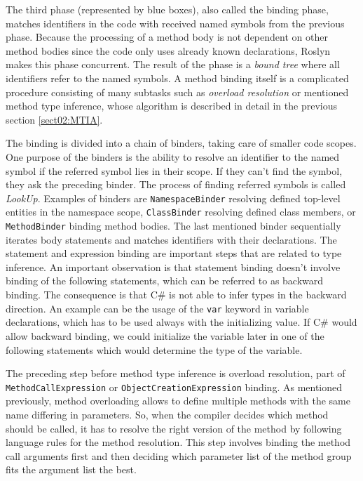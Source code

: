 The third phase (represented by blue boxes), also called the binding phase, matches identifiers in the code with received named symbols from the previous phase. 
Because the processing of a method body is not dependent on other method bodies since the code only uses already known declarations, Roslyn makes this phase concurrent. 
The result of the phase is a \emph{bound tree} where all identifiers refer to the named symbols. 
A method binding itself is a complicated procedure consisting of many subtasks such as \emph{overload resolution} or mentioned method type inference, whose algorithm is described in detail in the previous section \ref{sect02:MTIA}.
\par
The binding is divided into a chain of binders, taking care of smaller code scopes. 
One purpose of the binders is the ability to resolve an identifier to the named symbol if the referred symbol lies in their scope. 
If they can’t find the symbol, they ask the preceding binder. 
The process of finding referred symbols is called \emph{LookUp}. 
Examples of binders are \texttt{NamespaceBinder} resolving defined top-level entities in the namespace scope, \texttt{ClassBinder} resolving defined class members, or \texttt{MethodBinder} binding method bodies. 
The last mentioned binder sequentially iterates body statements and matches identifiers with their declarations. 
The statement and expression binding are important steps that are related to type inference.
An important observation is that statement binding doesn’t involve binding of the following statements, which can be referred to as backward binding. 
The consequence is that C\# is not able to infer types in the backward direction. 
An example can be the usage of the \texttt{var} keyword in variable declarations, which has to be used always with the initializing value. 
If C\# would allow backward binding, we could initialize the variable later in one of the following statements which would determine the type of the variable.
\par
The preceding step before method type inference is overload resolution, part of \texttt{MethodCallExpression} or \texttt{ObjectCreationExpression} binding. 
As mentioned previously, method overloading allows to define multiple methods with the same name differing in parameters. 
So, when the compiler decides which method should be called, it has to resolve the right version of the method by following language rules for the method resolution. 
This step involves binding the method call arguments first and then deciding which parameter list of the method group fits the argument list the best. 
